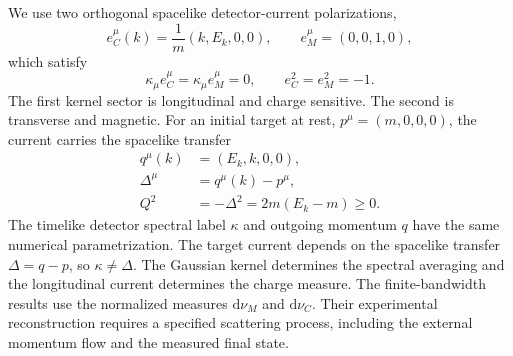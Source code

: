 \documentclass[12pt]{iopjournal}
\newcommand{\dd}{\mathrm d}
\theoremstyle{definition}
\theoremstyle{remark}
\begin{document}
We use two orthogonal spacelike detector-current polarizations,
\begin{equation}
e_C^\mu(k)=\frac1m(k,E_k,0,0),
\qquad
e_M^\mu=(0,0,1,0),
\label{eq:detector-polarizations}
\end{equation}
which satisfy
\begin{equation}
\kappa_\mu e_C^\mu=\kappa_\mu e_M^\mu=0,
\qquad e_C^2=e_M^2=-1.
\end{equation}
The first kernel sector is longitudinal and charge sensitive. The second is transverse and magnetic. For an initial target at rest, $p^\mu=(m,0,0,0)$, the current carries the spacelike transfer
\begin{align}
q^\mu(k)&=(E_k,k,0,0),\\
\Delta^\mu&=q^\mu(k)-p^\mu,\\
Q^2&=-\Delta^2=2m(E_k-m)\ge0.
\label{eq:spacelike-transfer}
\end{align}
The timelike detector spectral label $\kappa$ and outgoing momentum $q$ have the same numerical parametrization. The target current depends on the spacelike transfer $\Delta=q-p$, so $\kappa\ne\Delta$. The Gaussian kernel determines the spectral averaging and the longitudinal current determines the charge measure. The finite-bandwidth results use the normalized measures $\dd\nu_M$ and $\dd\nu_C$. Their experimental reconstruction requires a specified scattering process, including the external momentum flow and the measured final state.
\end{document}
